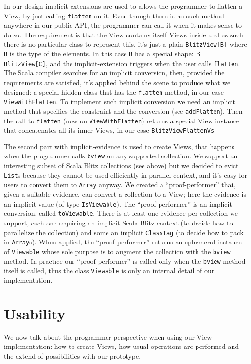 \documentclass[a4paper,12pt,twocolumn]{article}
\begin{document}
In our design implicit-extensions are used to allows the programmer to flatten a View, by just calling \verb|flatten| on it.
Even though there is no such method anywhere in our public API, the programmer can call it when it makes sense to do so.
The requirement is that the View contains itself Views inside and as such there is no particular class to represent this, it's just a plain \verb|BlitzView[B]| where \verb|B| is the type of the elements.
In this case \verb|B| has a special shape: B = \verb|BlitzView[C]|, and the implicit-extension triggers when the user calls \verb|flatten|.
The Scala compiler searches for an implicit conversion, then, provided the requirements are satisfied, it's applied behind the scene to produce what we designed: a special hidden class that has the \verb|flatten| method, in our case \verb|ViewWithFlatten|.
To implement such implicit conversion we need an implicit method that specifies the constraint and the conversion (see \verb|addFlatten|).
Then the call to \verb|flatten| (now on \verb|ViewWithFlatten|) returns a special View instance that concatenates all its inner Views, in our case \verb|BlitzViewFlattenVs|.

The second part with implicit-evidence is used to create Views, that happens when the programmer calls \verb|bview| on any supported collection.
We support an interesting subset of Scala Blitz collections (see above) but we decided to evict \verb|List|s because they cannot be used efficiently in parallel context, and it's easy for users to convert them to \verb|Array| anyway.
We created a ``proof-performer'' that, given a suitable evidence, can convert a collection to a View; here the evidence is an implicit value (of type \verb|IsViewable|).
The ``proof-performer'' is an implicit conversion, called \verb|toViewable|.
There is at least one evidence per collection we support, each one requiring an implicit Scala Blitz context (to decide how to parallelize the collection) and some an implicit \verb|ClassTag| (to decide how to pack in \verb|Array|s).
When applied, the ``proof-performer'' returns an ephemeral instance of \verb|Viewable| whose sole purpose is to augment the collection with the \verb|bview| method.
In practice our ``proof-performer'' is called only when the \verb|bview| method itself is called, thus the class \verb|Viewable| is only an internal detail of our implementation.

\section{Usability}
We now talk about the programmer perspective when using our View implementation: how to create Views, how usual operations are performed and the extend of possibilities with our prototype.
\end{document}

